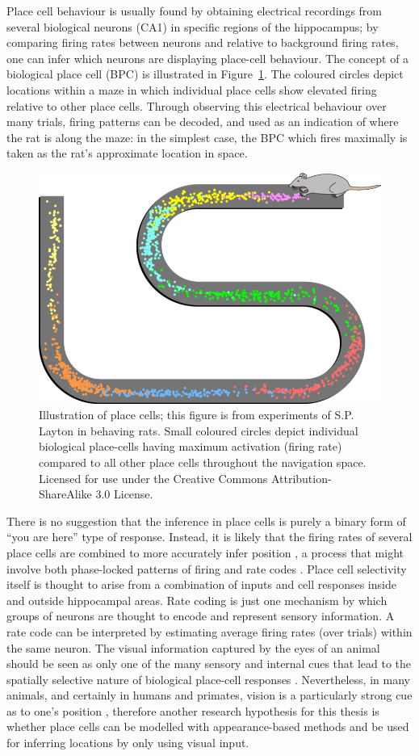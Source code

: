 Place cell behaviour is usually found by obtaining electrical recordings from several biological neurons (CA1) in specific regions of the hippocampus; by comparing firing rates between neurons and relative to background firing rates, one can infer which neurons are displaying place-cell behaviour. The concept of a biological place cell (BPC) is illustrated in Figure~\ref{fig:Maze}.  The coloured circles depict locations within a maze in which individual place cells show elevated firing relative to other place cells.  Through observing this electrical behaviour over many trials, firing patterns can be decoded, and used as an indication of where the rat is along the maze: in the simplest case, the BPC which fires maximally is taken as the rat's approximate location in space. 

\begin{figure}[!t]
\centering
\includegraphics[width=.6\linewidth]{./gfx/Chapter01/bio_place_cells_rat.png}
\caption{Illustration of place cells; this figure is from experiments of S.P. Layton in behaving rats. Small coloured circles depict individual biological place-cells having maximum activation (firing rate) compared to all other place cells throughout the navigation space. Licensed for use under the Creative Commons Attribution\--Share\-A\-like 3.0 License.}
\label{fig:Maze}
\end{figure}

There is no suggestion that the inference in place cells is purely a binary form of ``you are here'' type of response.  Instead, it is likely that the firing rates of several place cells are combined to more accurately infer position \cite{hafting2005microstructure}, a process that might involve both phase-locked patterns of firing and rate codes \cite{dragoi2006temporal}. Place cell selectivity itself is thought to arise from a combination of inputs and cell responses inside and outside hippocampal areas. Rate coding \cite{van2001rate} is just one mechanism by which groups of neurons are thought to encode and represent sensory information. A rate code can be interpreted by estimating average firing rates (over trials) within the same neuron. 
The visual information captured by the eyes of an animal should be seen as only one of the many sensory and internal cues that lead to the spatially selective nature of biological place-cell responses \cite{hassabis2009decoding}. Nevertheless, in many animals, and certainly in humans and primates, vision is a particularly strong cue as to one's position \cite{epstein1998cortical}, therefore another research hypothesis for this thesis is whether place cells can be modelled with appearance-based methods and be used for inferring locations by only using visual input.


